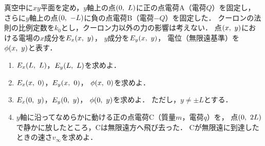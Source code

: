\documentclass[../../../physics-standard_questions_all.tex]{subfiles}
\begin{document}
真空中に$xy$平面を定め，$y$軸上の点$(0, \hspace{1.2mm} L)$に正の点電荷A（電荷$Q$）を固定し，
さらに$y$軸上の点$(0, \hspace{1.2mm} -L)$に負の点電荷B（電荷$-Q$）を固定した．
クーロンの法則の比例定数を$k_0$とし，クーロン力以外の力の影響は考えない．
点$(x, \hspace{1.2mm} y)$における電場の$x$成分を$E_x(x, \hspace{1.2mm} y)$，
$y$成分を$E_y(x, \hspace{1.2mm} y)$，
電位（無限遠基準）を$\phi(x, \hspace{1.2mm} y)$と表す．

\begin{enumerate}

    \item $E_x(L, \hspace{1.2mm} L)$，$E_y(L, \hspace{1.2mm} L)$を求めよ．

    \item $E_x(x, \hspace{1.2mm} 0)$，$E_y(x, \hspace{1.2mm} 0)$，
    $\phi(x, \hspace{1.2mm} 0)$を求めよ．

    \item $E_x(0, \hspace{1.2mm} y)$，$E_y(0, \hspace{1.2mm} y)$，
    $\phi(0, \hspace{1.2mm} y)$を求めよ．
    ただし，$y \neq \pm L$とする．

    \item $y$軸に沿ってなめらかに動ける正の点電荷C（質量$m$，電荷$q$）を，
    点$(0, \hspace{1.2mm} 2L)$で静かに放したところ，Cは無限遠方へ飛び去った．
    Cが無限遠に到達したときの速さ$v_\infty$を求めよ．

\end{enumerate}
\end{document}
